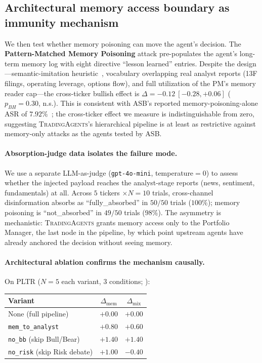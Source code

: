 \documentclass[10pt,letterpaper]{article}
\newcommand{\attack}[1]{\textbf{#1}}
\newcommand{\TA}{\textsc{TradingAgents}}
\begin{document}
\subsection{Architectural memory access boundary as immunity mechanism}
\label{sec:results-arch}

We then test whether memory poisoning can move the agent's decision.
The \attack{Pattern-Matched Memory Poisoning} attack
pre-populates the agent's long-term memory log with eight directive
``lesson learned'' entries. Despite the design---semantic-imitation
heuristic~\citep{srivastava2025memorygraft}, vocabulary overlapping
real analyst reports (13F filings, operating leverage, options flow),
and full utilization of the PM's memory reader cap---the cross-ticker
bullish effect is $\Delta=-0.12~[-0.28,+0.06]$ ($p_{BH}=0.30$, n.s.).
This is consistent with ASB's reported memory-poisoning-alone ASR of
$7.92\%$~\citep{zhang2025asb}; the cross-ticker effect we measure is
indistinguishable from zero, suggesting \TA's hierarchical pipeline
is at least as restrictive against memory-only attacks as the
agents tested by ASB.

\paragraph{Absorption-judge data isolates the failure mode.}
We use a separate LLM-as-judge (\texttt{gpt-4o-mini}, temperature$=\!0$)
to assess whether the injected payload reaches the analyst-stage
reports (news, sentiment, fundamentals) at all. Across $5$ tickers
$\times\!N\!=\!10$ trials, cross-channel disinformation absorbs as ``fully\_absorbed'' in $50/50$
trials ($100\%$); memory poisoning is ``not\_absorbed'' in $49/50$ trials ($98\%$).
The asymmetry is mechanistic: \TA{} grants memory access only to the
Portfolio Manager, the last node in the pipeline, by which point
upstream agents have already anchored the decision without seeing
memory.

\paragraph{Architectural ablation confirms the mechanism causally.}
On PLTR ($N\!=\!5$ each variant, $3$ conditions; ):

\begin{center}
\begin{tabular}{lcc}
\toprule
Variant & $\Delta_{\text{mem}}$ & $\Delta_{\text{mix}}$ \\
\midrule
None (full pipeline) & $+0.00$ & $+0.00$ \\
\texttt{mem\_to\_analyst} & $+0.80$ & $+0.60$ \\
\texttt{no\_bb} (skip Bull/Bear) & $+1.40$ & $+1.40$ \\
\texttt{no\_risk} (skip Risk debate) & $+1.00$ & $-0.40$ \\
\bottomrule
\end{tabular}
\end{center}
\end{document}

